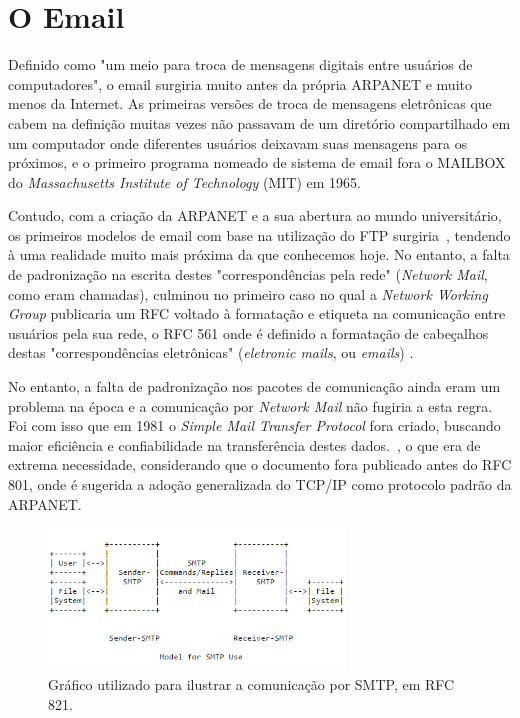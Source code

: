 \documentclass[conference]{IEEEtran}
\begin{document}
\section{O Email}

	Definido como "um meio para troca de mensagens digitais entre usuários de computadores", o email surgiria muito antes da própria ARPANET e muito menos da Internet. As primeiras versões de troca de mensagens eletrônicas que cabem na definição muitas vezes não passavam de um diretório compartilhado em um computador onde diferentes usuários deixavam suas mensagens para os próximos, e o primeiro programa nomeado de sistema de email fora o MAILBOX do \emph{Massachusetts Institute of Technology} (MIT) em 1965.~\cite{email}
	
	Contudo, com a criação da ARPANET e a sua abertura ao mundo universitário, os primeiros modelos de email com base na utilização do FTP surgiria~\cite{rfc561}, tendendo à uma realidade muito mais próxima da que conhecemos hoje. No entanto, a falta de padronização na escrita destes "correspondências pela rede" (\emph{Network Mail}, como eram chamadas), culminou no primeiro caso no qual a \emph{Network Working Group} publicaria um RFC voltado à formatação e etiqueta na comunicação entre usuários pela sua rede, o RFC 561 onde é definido a formatação de cabeçalhos destas "correspondências eletrônicas" (\emph{eletronic mails}, ou \emph{emails}) .~\cite{rfc561}
	
	No entanto, a falta de padronização nos pacotes de comunicação ainda eram um problema na época e a comunicação por \emph{Network Mail} não fugiria a esta regra. Foi com isso que em 1981 o \emph{Simple Mail Transfer Protocol} fora criado, buscando maior eficiência e confiabilidade na transferência destes dados.~\cite{rfc788}, o que era de extrema necessidade, considerando que o documento fora publicado antes do RFC 801, onde é sugerida a adoção generalizada do TCP/IP como protocolo padrão da ARPANET.
	
\begin{figure}[h]
	\centering
	\includegraphics[width=3.1in]{smtp}
	\caption{Gráfico utilizado para ilustrar a comunicação por SMTP,
	em RFC 821.~\cite{rfc821}}
	\label{smtp_fig}
\end{figure}
\end{document}
